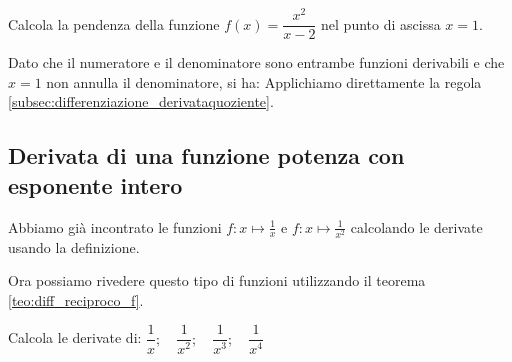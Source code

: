 \pagebreak %

\begin{esempio}
 Calcola la pendenza della funzione \(f(x)=\dfrac{x^2}{x-2}\) nel punto 
di ascissa \(x=1\).

Dato che il numeratore e il 
denominatore sono entrambe funzioni derivabili e che \(x=1\) non annulla il 
denominatore, si ha: 
Applichiamo direttamente la regola 
\ref{subsec:differenziazione_derivataquoziente}.

\end{esempio}

\subsection{Derivata di una funzione potenza con esponente intero}
\label{subsubsec:derivata_f_potenza_Z} 

Abbiamo già incontrato le funzioni \(f: x \mapsto \frac{1}{x}\) e 
\(f: x \mapsto \frac{1}{x^2}\) calcolando le derivate 
usando la definizione.

Ora possiamo rivedere questo tipo di funzioni utilizzando il teorema 
\ref{teo:diff_reciproco_f}.

\begin{esempio}
Calcola le derivate di: 
\(\dfrac{1}{x}; \quad \dfrac{1}{x^2}; \quad 
\dfrac{1}{x^3}; \quad \dfrac{1}{x^4}\)

\end{esempio}

